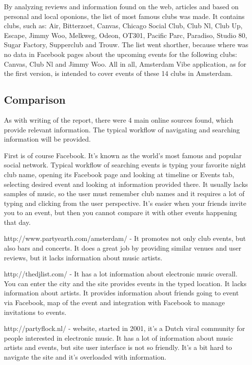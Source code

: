 \documentclass[12pt, a4paper, lithuanian]{article}
\begin{document}
  By analyzing reviews and information found on the web, articles and based on personal and local oponions, the list of most famous clubs was made. It contains clubs, such as: Air, Bitterzoet, Canvas, Chicago Social Club, Club Nl, Club Up, Escape, Jimmy Woo, Melkweg, Odeon, OT301, Pacific Parc, Paradiso, Studio 80, Sugar Factory, Supperclub and Trouw. The list went shorther, because where was no data in Facebook pages about the upcoming events for the following clubs: Canvas, Club Nl and Jimmy Woo. All in all, Amsterdam Vibe application, as for the first version, is intended to cover events of these 14 clubs in Amsterdam.

\subsection{Comparison}

  As with writing of the report, there were 4 main online sources found, which provide relevant information. The typical workflow of navigating and searching information will be provided.

  First is of course Facebook. It's known as the world's most famous and popular social network. Typical workflow of searching events is typing your favorite night club name, opening its Facebook page and looking at timeline or Events tab, selecting desired event and looking at information provided there. It usually lacks samples of music, so the user must remember club names and it requires a lot of typing and clicking from the user perspective. It's easier when your friends invite you to an event, but then you cannot compare it with other events happening that day.

  http://www.partyearth.com/amsterdam/ - It promotes not only club events, but also bars and concerts. It does a great job by providing similar venues and user reviews, but it lacks information about music artists.

  http://thedjlist.com/ - It has a lot information about electronic music overall. You can enter the city and the site provides events in the typed location. It lacks information about artists. It provides information about friends going to event via Facebook, map of the event and integration with Facebook to manage invitations to events. 

  http://partyflock.nl/ - website, started in 2001, it's a Dutch viral community for people interested in electronic music. It has a lot of information about music artists and events, but site user interface is not so friendly. It's a bit hard to navigate the site and it's overloaded with information.
\end{document}
